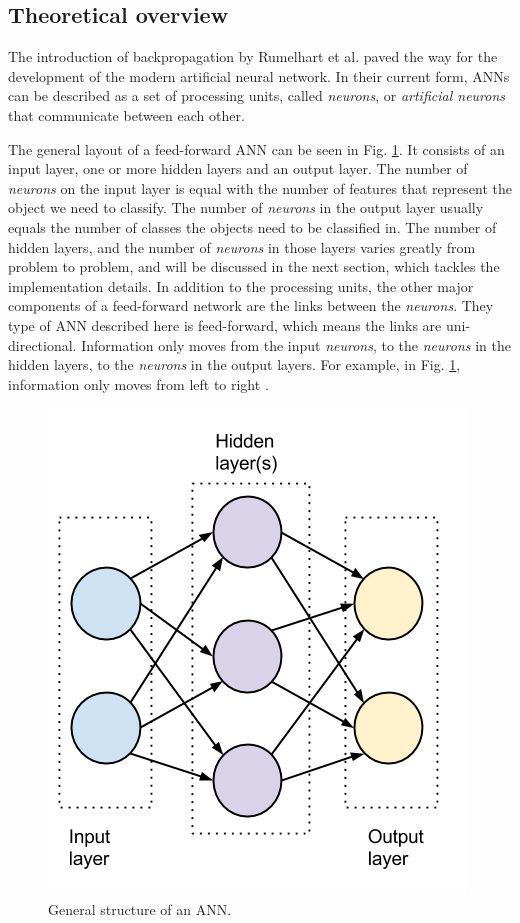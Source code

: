 \subsection{Theoretical overview}

The introduction of backpropagation by Rumelhart et al. \cite{rumelhart} paved the way for the development of the modern artificial neural network. In their current form, ANNs can be described as a set of processing units, called \textit{neurons}, or \textit{artificial neurons} that communicate between each other. 

The general layout of a feed-forward ANN can be seen in Fig. \ref{pic:ann}. It consists of an input layer, one or more hidden layers and an output layer. The number of \textit{neurons} on the input layer is equal with the number of features that represent the object we need to classify. The number of \textit{neurons} in the output layer usually equals the number of classes the objects need to be classified in. The number of hidden layers, and the number of \textit{neurons} in those layers varies greatly from problem to problem, and will be discussed in the next section, which tackles the implementation details.
In addition to the processing units, the other major components of a feed-forward network are the links between the \textit{neurons}. They type of ANN described here is feed-forward, which means the links are uni-directional. Information only moves from the input \textit{neurons}, to the \textit{neurons} in the hidden layers, to the \textit{neurons} in the output layers. For example, in Fig. \ref{pic:ann}, information only moves from left to right \cite{annintroduction2}.  

\begin{figure}[h]
	\begin{center}
		\includegraphics[scale=0.6]{figures/ANN.png}
	\end{center}
	
	\caption{General structure of an ANN.}
	\label{pic:ann}

\end{figure} 


